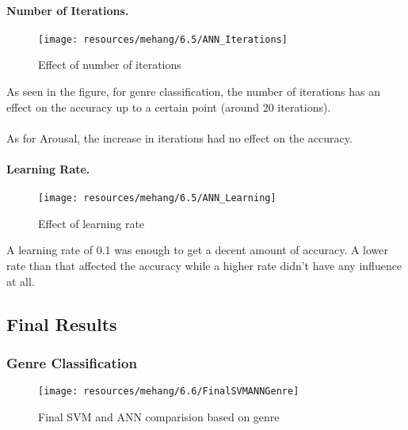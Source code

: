 \paragraph{Number of Iterations.}
\begin{figure}[h!]
        \centering
        \texttt{[image: resources/mehang/6.5/ANN\_Iterations]}
        \caption{Effect of number of iterations}
\end{figure}
As seen in the figure, for genre classification, the number of iterations has an effect on the accuracy up to a certain point (around 20 iterations).\\
\\
As for Arousal, the increase in iterations had no effect on the accuracy. 

\newpage
\paragraph{Learning Rate.}
\begin{figure}[h!]
        \centering
        \texttt{[image: resources/mehang/6.5/ANN\_Learning]}
        \caption{Effect of learning rate}
\end{figure}

A learning rate of 0.1 was enough to get a decent amount of accuracy. A lower rate than that affected the accuracy while a higher rate didn’t have any influence at all.

\newpage
\subsection{Final Results}
\subsubsection{Genre Classification}
\begin{figure}[h!]
        \centering
        \texttt{[image: resources/mehang/6.6/FinalSVMANNGenre]}
        \caption{Final SVM and ANN comparision based on genre}
\end{figure}

